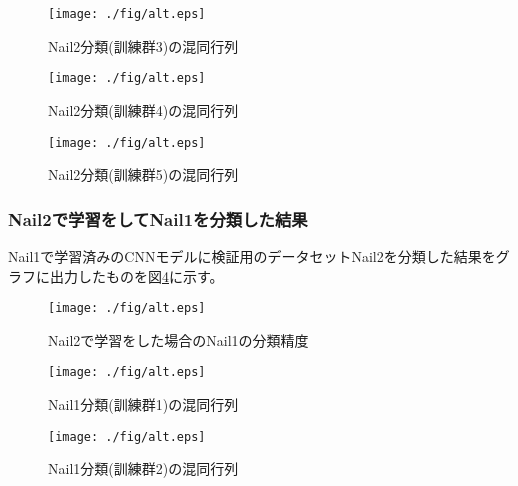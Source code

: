 		\begin{figure}[htbp]
			\begin{center}
			  \texttt{[image: ./fig/alt.eps]}
			  \caption{Nail2分類(訓練群3)の混同行列}
			  \label{fig:3_2}
			\end{center}
		\end{figure}

		\begin{figure}[htbp]
			\begin{center}			  
			  \texttt{[image: ./fig/alt.eps]}
			  \caption{Nail2分類(訓練群4)の混同行列}
			  \label{fig:3_2}
			\end{center}
		\end{figure}

		\begin{figure}[htbp]
			\begin{center}			  			  
			  \texttt{[image: ./fig/alt.eps]}
			  \caption{Nail2分類(訓練群5)の混同行列}
			  \label{fig:3_2}
			\end{center}
		\end{figure}

		

		\subsubsection{Nail2で学習をしてNail1を分類した結果}
		Nail1で学習済みのCNNモデルに検証用のデータセットNail2を分類した結果をグラフに出力したものを図\ref{fig:3_1}に示す。
		\begin{figure}[htbp]
			\begin{center}
			  \texttt{[image: ./fig/alt.eps]}
			  \caption{Nail2で学習をした場合のNail1の分類精度}
			  \label{fig:3_1}
			\end{center}
		\end{figure}

		\begin{figure}[htbp]
			\begin{center}
			  \texttt{[image: ./fig/alt.eps]}
			  \caption{Nail1分類(訓練群1)の混同行列}
			  \label{fig:3_2}
			\end{center}
		\end{figure}
		\begin{figure}[htbp]
			\begin{center}
			  \texttt{[image: ./fig/alt.eps]}
			  \caption{Nail1分類(訓練群2)の混同行列}
			  \label{fig:3_2}
			\end{center}
		\end{figure}

